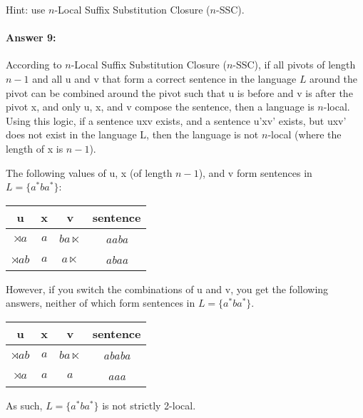 \documentclass[10pt]{article}
\begin{document}
\noindent Hint: use $n$-Local Suffix Substitution Closure ($n$-SSC).

\paragraph{Answer 9:} According to $n$-Local Suffix Substitution Closure ($n$-SSC), if all pivots of length $n-1$ and all u and v that form a correct sentence in the language $L$ around the pivot can be combined around the pivot such that u is before and v is after the pivot x, and only u, x, and v compose the sentence, then a language is $n$-local. Using this logic, if a sentence uxv exists, and a sentence u'xv' exists, but uxv' does not exist in the language L, then the language is not $n$-local (where the length of x is $n-1$).

\noindent The following values of u, x (of length $n-1$), and v form sentences in $L=\{a^* b a^*\}$:

\begin{center}
    \begin{tabular}{| c | c | c | c |}
        \hline
         \textbf{u} & \textbf{x} & \textbf{v} & \textbf{sentence}\\
         \hline
         $\rtimes a$ & $a$ & $b a \ltimes$ & \textit{aaba}\\
         \hline 
         $\rtimes a b$ & $a$ & $a \ltimes$ & \textit{abaa}\\
         \hline
    \end{tabular}
\end{center}

\noindent However, if you switch the combinations of u and v, you get the following answers, neither of which form sentences in $L=\{a^* b a^*\}$. 

\begin{center}
    \begin{tabular}{| c | c | c | c |}
        \hline
         \textbf{u} & \textbf{x} & \textbf{v} & \textbf{sentence}\\
         \hline
         $\rtimes a b$ & $a$ & $b a \ltimes$  & \textit{ababa}\\
         \hline 
         $\rtimes a$ & $a$ & $a$ & \textit{aaa}\\
         \hline
    \end{tabular}
\end{center}

\noindent As such, $L=\{a^* b a^*\}$ is not strictly 2-local.

\hrulefill
\end{document}
